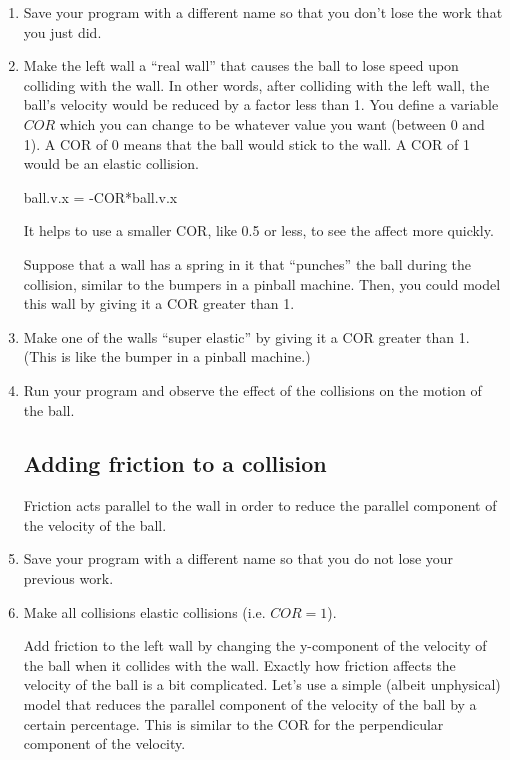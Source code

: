 \begin{enumerate}
\item Save your program with a different name so that you don't lose the work that you just did.

\item Make the left wall a ``real wall'' that causes the ball to lose speed upon colliding with the wall. In other words, after colliding with the left wall, the ball's velocity would be reduced by a factor less than 1. You define a variable $COR$ which you can change to be whatever value you want (between 0 and 1).  A COR of 0 means that the ball would stick to the wall. A COR of 1 would be an elastic collision.

\begin{myvpython}
        ball.v.x = -COR*ball.v.x
\end{myvpython}

It helps to use a smaller COR, like 0.5 or less, to see the affect more quickly.


Suppose that a wall has a spring in it that ``punches'' the ball during the collision, similar to the bumpers in a pinball machine. Then, you could model this wall by giving it a COR greater than 1.

\item Make one of the walls ``super elastic'' by giving it a COR greater than 1. (This is like the bumper in a pinball machine.)

\item Run your program and observe the effect of the collisions on the motion of the ball.

\subsection*{Adding friction to a collision}

Friction acts parallel to the wall in order to reduce the parallel component of the velocity of the ball.

\item Save your program with a different name so that you do not lose your previous work.

\item Make all collisions elastic collisions (i.e. $COR=1$).

Add friction to the left wall by changing the y-component of the velocity of the ball when it collides with the wall.  Exactly how friction affects the velocity of the ball is a bit complicated. Let's use a simple (albeit unphysical) model that reduces the parallel component of the velocity of the ball by a certain percentage. This is similar to the COR for the perpendicular component of the velocity.


\end{enumerate}
